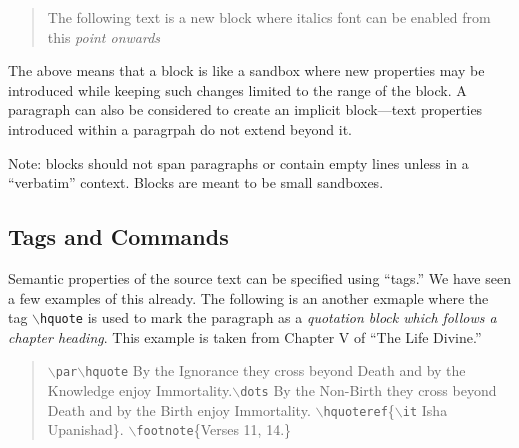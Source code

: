 \documentclass[11pt]{article}
\newcommand{\cmd}[1]{{\tt $\backslash$#1}}
\begin{document}
\begin{quote}
The following text {is a new block where italics font can be enabled
from this \it point onwards}
\end{quote}

The above means that a block is like a sandbox where new properties
may be introduced while keeping such changes limited to the range of
the block. A paragraph can also be considered to create an implicit
block---text properties introduced within a paragrpah do not extend
beyond it.

Note: blocks should not span paragraphs or contain empty
lines unless in a ``verbatim'' context. Blocks are meant to be small
sandboxes.








\subsection{Tags and Commands}

Semantic properties of the source text can be specified using
``tags.'' We have seen a few examples of this already. The following
is an another exmaple where the tag \cmd{hquote} is used to mark the
paragraph as a {\it quotation block which follows a chapter
  heading}. This example is taken from Chapter V of ``The Life
Divine.''

\begin{quote}
\cmd{par}\cmd{hquote} By the Ignorance they cross beyond Death and by
the Knowledge enjoy Immortality.\cmd{dots} By the Non-Birth they cross
beyond Death and by the Birth enjoy Immortality.
\cmd{hquoteref}\{\cmd{it} Isha Upanishad\}.
\cmd{footnote}\{Verses 11, 14.\}
\end{quote}
\end{document}
